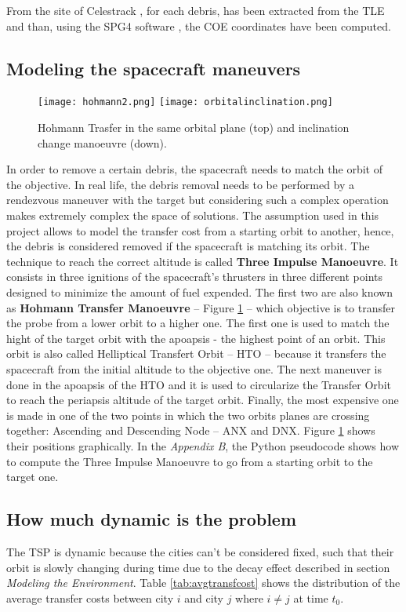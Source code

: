 \documentclass[a4paper,9pt,journal,twoside,compsoc]{PPIEEEtran}
\begin{document}
From the site of Celestrack \cite{celestrack}, for each debris, has been extracted from the TLE and than, using the SPG4 software \cite{spg4}, the COE coordinates have been computed.



\subsection{Modeling the spacecraft maneuvers}
\begin{figure}[h]
\centering%
\texttt{[image: hohmann2.png]}
\quad
\texttt{[image: orbitalinclination.png]}
\quad
\caption{Hohmann Trasfer in the same orbital plane (top) and inclination change manoeuvre (down).}
\label{fig:orbitalchange}
\end{figure} 
In order to remove a certain debris, the spacecraft needs to match the orbit of the objective. In real life, the debris removal needs to be performed by a rendezvous maneuver with the target but considering such a complex operation makes extremely complex the space of solutions. The assumption used in this project allows to model the transfer cost from a starting orbit to another, hence, the debris is considered removed if the spacecraft is matching its orbit.
The technique to reach the correct altitude is called \textbf{Three Impulse Manoeuvre}. It consists in three ignitions of the spacecraft's thrusters in three different points designed to minimize the amount of fuel expended. The first two are also known as \textbf{Hohmann Transfer Manoeuvre} -- Figure \ref{fig:orbitalchange} -- which objective is to transfer the probe from a lower orbit to a higher one. The first one is used to match the hight of the target orbit with the apoapsis - the highest point of an orbit. This orbit is also called Helliptical Transfert Orbit -- HTO -- because it transfers the spacecraft from the initial altitude to the objective one.
The next maneuver is done in the apoapsis of the HTO and it is used to circularize the Transfer Orbit to reach the periapsis altitude of the target orbit. Finally, the most expensive one is made in one of the two points in which the two orbits planes are crossing together: Ascending and Descending Node -- ANX and DNX. Figure \ref{fig:orbitalchange} shows their positions graphically. In the \textit{Appendix B}, the Python pseudocode shows how to compute the Three Impulse Manoeuvre to go from a starting orbit to the target one.



\subsection{How much dynamic is the problem}
The TSP is dynamic because the cities can't be considered fixed, such that their orbit is slowly changing during time due to the decay effect described in section \textit{Modeling the Environment}. Table \ref{tab:avgtransfcost} shows the distribution of the average transfer costs between city $i$ and city $j$ where $i \neq j$ at time $t_0$.
\end{document}
